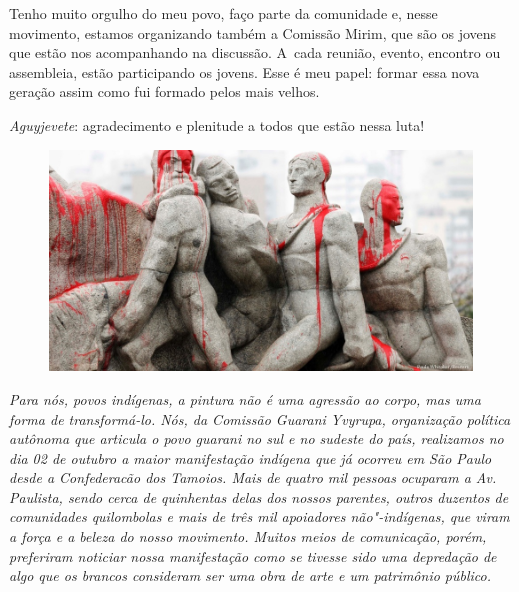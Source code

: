 Tenho muito orgulho do meu povo, faço parte da comunidade e, nesse
movimento, estamos organizando também a Comissão Mirim, que são os
jovens que estão nos acompanhando na discussão. A~cada reunião, evento,
encontro ou assembleia, estão participando os jovens. Esse é meu papel:
formar essa nova geração assim como fui formado pelos mais velhos. 

\emph{Aguyjevete}: agradecimento e plenitude a todos que estão nessa luta!

\pagebreak

\begin{figure}[h]
 \includegraphics[width=\textwidth]{./img/GUARANIS-img2.jpg}	
\end{figure}


\noindent
\emph{Para nós, povos indígenas, a pintura não é uma agressão ao corpo, mas
uma forma de transformá-lo. Nós, da Comissão Guarani Yvyrupa,
organização política autônoma que articula o povo guarani no sul
e no sudeste do país, realizamos no dia 02 de outubro
a maior manifestação indígena que já ocorreu em São Paulo
desde a Confederacão dos Tamoios. Mais de quatro mil pessoas ocuparam a
Av. Paulista, sendo cerca de quinhentas delas dos nossos parentes,
outros duzentos de comunidades quilombolas e mais de três mil
apoiadores não"-indígenas, que viram a força e a beleza do nosso
movimento. Muitos meios de comunicação, porém, preferiram noticiar
nossa manifestação como se tivesse sido uma depredação de algo que os
brancos consideram ser uma obra de arte e um patrimônio público.} 


